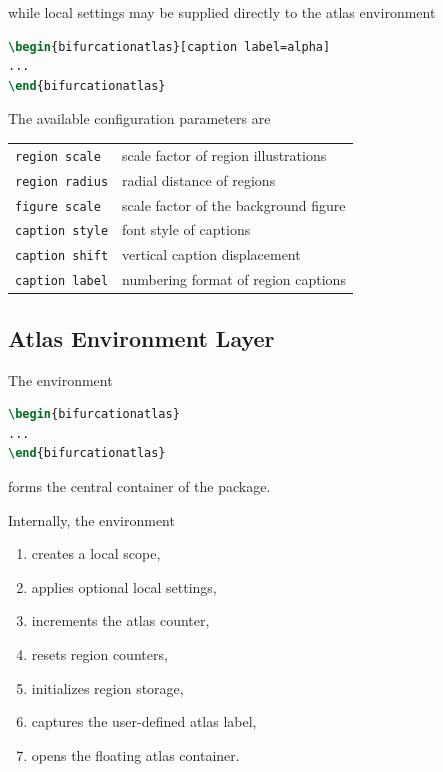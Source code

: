 while local settings may be supplied directly to the atlas environment

\begin{lstlisting}[language=LaTeX]
\begin{bifurcationatlas}[caption label=alpha]
...
\end{bifurcationatlas}
\end{lstlisting}

The available configuration parameters are

\begin{center}
\begin{tabular}{ll}
\lstinline|region scale| & scale factor of region illustrations\\
\lstinline|region radius| & radial distance of regions\\
\lstinline|figure scale| & scale factor of the background figure\\
\lstinline|caption style| & font style of captions\\
\lstinline|caption shift| & vertical caption displacement\\
\lstinline|caption label| & numbering format of region captions
\end{tabular}
\end{center}

\subsection{Atlas Environment Layer}

The environment

\begin{lstlisting}[language=LaTeX]
\begin{bifurcationatlas}
...
\end{bifurcationatlas}
\end{lstlisting}

forms the central container of the package.

Internally, the environment

\begin{enumerate}
\item creates a local scope,
\item applies optional local settings,
\item increments the atlas counter,
\item resets region counters,
\item initializes region storage,
\item captures the user-defined atlas label,
\item opens the floating atlas container.
\end{enumerate}

